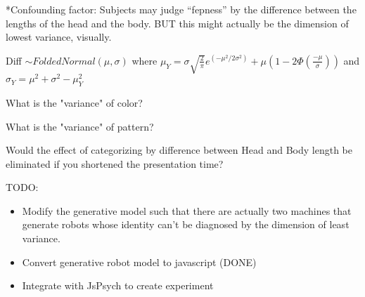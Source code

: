 \documentclass[12pt]{article}
\begin{document}
\vspace{0.2in}

\noindent **Confounding factor: Subjects may judge ``fepness'' by the difference between the lengths of the head and the body. BUT this might actually be the dimension of lowest variance, visually.

\vspace{0.2in}

\noindent Diff $\sim FoldedNormal(\mu,\sigma)$ where $\mu_Y = \sigma \sqrt{\frac{2}{\pi}}e^{(-\mu^2/2\sigma^2)} + \mu (1-2\Phi(\frac{-\mu}{\sigma}))$ and $\sigma_Y = \mu^2 + \sigma^2 - \mu_Y ^2$

\noindent What is the "variance" of color?

\noindent What is the "variance" of pattern?

\noindent Would the effect of categorizing by difference between Head and Body length be eliminated if you shortened the presentation time?

\vspace{0.5in}
\noindent TODO:
\begin{itemize}
	\item Modify the generative model such that there are actually two machines that generate robots whose identity can't be diagnosed by the dimension of least variance. 
	\item Convert generative robot model to javascript (DONE)
	\item Integrate with JsPsych to create experiment
\end{itemize}
\end{document}
